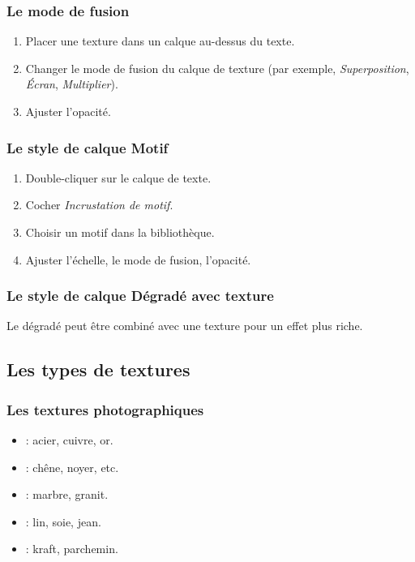 \subsubsection{Le mode de fusion}

\begin{enumerate}
    \item Placer une texture dans un calque au-dessus du texte.
    \item Changer le mode de fusion du calque de texture (par exemple, \emph{Superposition}, \emph{Écran}, \emph{Multiplier}).
    \item Ajuster l'opacité.
\end{enumerate}

\subsubsection{Le style de calque Motif}

\begin{enumerate}
    \item Double-cliquer sur le calque de texte.
    \item Cocher \emph{Incrustation de motif}.
    \item Choisir un motif dans la bibliothèque.
    \item Ajuster l'échelle, le mode de fusion, l'opacité.
\end{enumerate}

\subsubsection{Le style de calque Dégradé avec texture}

Le dégradé peut être combiné avec une texture pour un effet plus riche.

\subsection{Les types de textures}

\subsubsection{Les textures photographiques}

\begin{itemize}
    \item {} : acier, cuivre, or.
    \item {} : chêne, noyer, etc.
    \item {} : marbre, granit.
    \item {} : lin, soie, jean.
    \item {} : kraft, parchemin.
\end{itemize}

